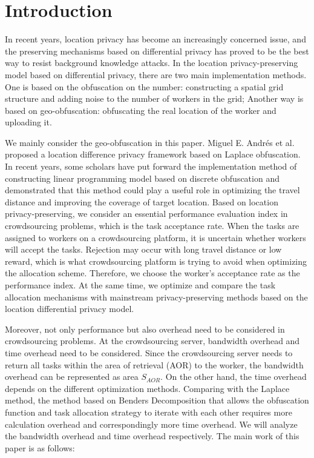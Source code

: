 \section{Introduction}

In recent years, location privacy has become an increasingly concerned issue, and the preserving mechanisms based on differential privacy has proved to be the best way to resist background knowledge attacks. In the location privacy-preserving model based on differential privacy, there are two main implementation methods. One is based on the obfuscation on the number: constructing a spatial grid structure and adding noise to the number of workers in the grid; Another way is based on geo-obfuscation: obfuscating the real location of the worker and uploading it.

We mainly consider the geo-obfuscation in this paper. Miguel E. Andrés et al. proposed a location difference privacy framework based on Laplace obfuscation. In recent years, some scholars have put forward the implementation method of constructing linear programming model based on discrete obfuscation and demonstrated that this method could play a useful role in optimizing the travel distance and improving the coverage of target location.
Based on location privacy-preserving, we consider an essential performance evaluation index in crowdsourcing problems, which is the task acceptance rate. When the tasks are assigned to workers on a crowdsourcing platform, it is uncertain whether workers will accept the tasks. Rejection may occur with long travel distance or low reward, which is what crowdsourcing platform is trying to avoid when optimizing the allocation scheme. Therefore, we choose the worker's acceptance rate as the performance index. At the same time, we optimize and compare the task allocation mechanisms with mainstream privacy-preserving methods based on the location differential privacy model.

Moreover, not only performance but also overhead need to be considered in crowdsourcing problems. At the crowdsourcing server, bandwidth overhead and time overhead need to be considered. Since the crowdsourcing server needs to return all tasks within the area of retrieval (AOR) to the worker, the bandwidth overhead can be represented as area $S_{AOR}$. On the other hand, the time overhead depends on the different optimization methods. Comparing with the Laplace method, the method based on Benders Decomposition that allows the obfuscation function and task allocation strategy to iterate with each other requires more calculation overhead and correspondingly more time overhead. We will analyze the bandwidth overhead and time overhead respectively.
The main work of this paper is as follows:

